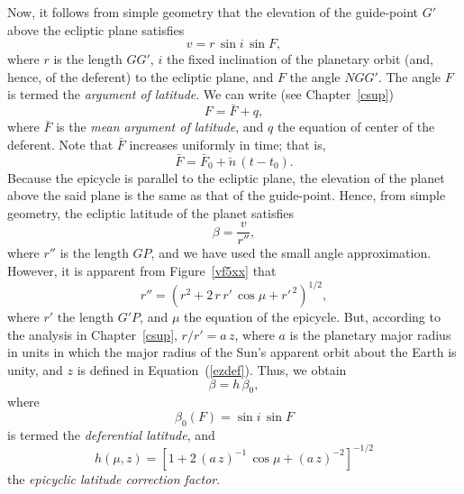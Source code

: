 Now, it follows from simple geometry that the elevation of the guide-point $G'$ above  the
ecliptic plane satisfies 
\begin{equation}
v= r\,\sin i\,\sin F,
\end{equation}
 where $r$ is the length $GG'$, $i$  the fixed inclination of the
planetary orbit (and, hence, of the deferent) to the ecliptic plane, and $F$  the angle $NGG'$. The
angle $F$ is termed the {\em argument of latitude}. We can write (see Chapter~\ref{csup})
\begin{equation}
F = \bar{F} + q,
\end{equation}
where $\bar{F}$ is the {\em mean argument of latitude}, and $q$ the equation of center of the deferent. Note that $\bar{F}$
increases uniformly in time; that is, 
\begin{equation}
\bar{F}  = \bar{F}_0 + \breve{n}\,(t-t_0).
\end{equation}
 Because the epicycle is parallel to the ecliptic
plane, the elevation of the planet above the said plane is
the same as that of the guide-point. Hence, from simple geometry, the ecliptic latitude of the planet satisfies
\begin{equation}
\beta = \frac{v}{r''},
\end{equation}
where $r''$ is the length $GP$, and
we have used the small angle approximation. However, it is apparent from Figure~\ref{vf5xx} that
\begin{equation}
r'' = (r^2 + 2\,r\,r'\,\cos\mu+ r'^{\,2})^{1/2},
\end{equation}
where $r'$ the length $G'P$, and $\mu$ the
equation of the epicycle. But, according to the analysis in Chapter~\ref{csup}, $r/r' = a\,z$, where $a$ is the planetary
major radius in units in which the major radius of the Sun's apparent orbit
about the Earth is unity, and $z$ is defined in Equation~(\ref{ezdef}).
Thus, we obtain
\begin{equation}
\beta =h\,\beta_0,
\end{equation}
where
\begin{equation}
\beta_0(F) = \sin i\,\sin F
\end{equation}
is termed the {\em  deferential latitude},
and
\begin{equation}
h(\mu,z) = \left[1 + 2\,(a\,z)^{-1}\,\cos\mu+ (a\,z)^{-2}\right]^{-1/2}
\end{equation}
the {\em epicyclic latitude correction factor}.

